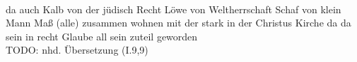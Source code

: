 \begin{exe}
\ex \label{ex:I5613} \gll {}                                             \\
{da} {auch} {} {Kalb} {} {von} {der} {jüdisch} {Recht} {} {} {Löwe} {} {von} {Weltherrschaft} {} {} {Schaf} {} {von} {klein} {Mann} {Maß} {} {(alle) zusammen} {wohnen} {} {mit} {der} {stark} {in} {der} {Christus} {Kirche} {} {da} {da} {sein} {in} {recht} {Glaube} {all} {sein} {zuteil geworden} {}\\
\glt TODO: nhd. Übersetzung (I.9,9)
\end{exe}
